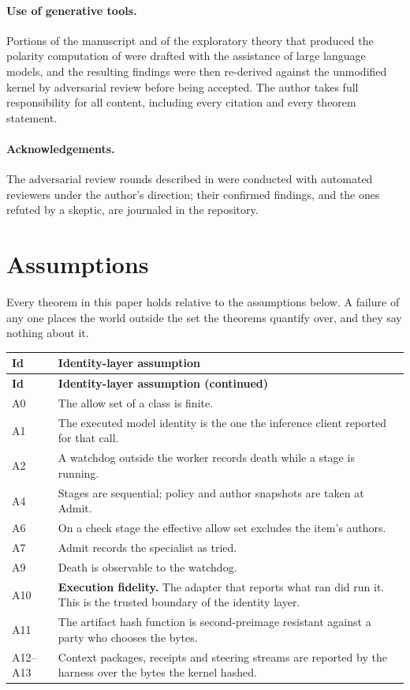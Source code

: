 \documentclass[11pt,a4paper]{article}
\theoremstyle{plain}
\theoremstyle{definition}
\theoremstyle{remark}
\begin{document}
\paragraph{Use of generative tools.} Portions of the manuscript and of the exploratory theory that produced the polarity computation of  were drafted with the assistance of large language models, and the resulting findings were then re-derived against the unmodified kernel by adversarial review before being accepted. The author takes full responsibility for all content, including every citation and every theorem statement.

\paragraph{Acknowledgements.} The adversarial review rounds described in  were conducted with automated reviewers under the author's direction; their confirmed findings, and the ones refuted by a skeptic, are journaled in the repository.

\appendix

\section{Assumptions}
\label{app:assumptions}

Every theorem in this paper holds relative to the assumptions below. A failure of any one places the world outside the set the theorems quantify over, and they say nothing about it.

\begin{longtable}{@{}p{}p{}@{}}
\toprule
\textbf{Id} & \textbf{Identity-layer assumption} \\
\midrule
\endfirsthead
\toprule
\textbf{Id} & \textbf{Identity-layer assumption (continued)} \\
\midrule
\endhead
A0 & The allow set of a class is finite. \\
A1 & The executed model identity is the one the inference client reported for that call. \\
A2 & A watchdog outside the worker records death while a stage is running. \\
A4 & Stages are sequential; policy and author snapshots are taken at Admit. \\
A6 & On a check stage the effective allow set excludes the item's authors. \\
A7 & Admit records the specialist as tried. \\
A9 & Death is observable to the watchdog. \\
A10 & \textbf{Execution fidelity.} The adapter that reports what ran did run it. This is the trusted boundary of the identity layer. \\
A11 & The artifact hash function is second-preimage resistant against a party who chooses the bytes. \\
A12--A13 & Context packages, receipts and steering streams are reported by the harness over the bytes the kernel hashed. \\
\bottomrule
\end{longtable}
\end{document}
